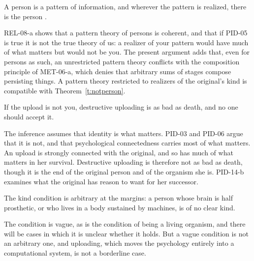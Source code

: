 \documentclass{situationist-preprint}
\begin{document}
\begin{objection}
A person is a pattern of information, and wherever the pattern is realized, there is the person \citep{Kurzweil2005}.
\end{objection}

\begin{reply}
REL-08-a shows that a pattern theory of persons is coherent, and that if PID-05 is true it is not the true theory of us: a realizer of your pattern would have much of what matters but would not be you. The present argument adds that, even for persons as such, an unrestricted pattern theory conflicts with the composition principle of MET-06-a, which denies that arbitrary sums of stages compose persisting things. A pattern theory restricted to realizers of the original's kind is compatible with Theorem~\ref{t:notperson}.
\end{reply}

\begin{objection}
If the upload is not you, destructive uploading is as bad as death, and no one should accept it.
\end{objection}

\begin{reply}
The inference assumes that identity is what matters. PID-03 and PID-06 argue that it is not, and that psychological connectedness carries most of what matters. An upload is strongly connected with the original, and so has much of what matters in her survival. Destructive uploading is therefore not as bad as death, though it is the end of the original person and of the organism she is. PID-14-b examines what the original has reason to want for her successor.
\end{reply}

\begin{objection}
The kind condition is arbitrary at the margins: a person whose brain is half prosthetic, or who lives in a body sustained by machines, is of no clear kind.
\end{objection}

\begin{reply}
The condition is vague, as is the condition of being a living organism, and there will be cases in which it is unclear whether it holds. But a vague condition is not an arbitrary one, and uploading, which moves the psychology entirely into a computational system, is not a borderline case.
\end{reply}
\end{document}
